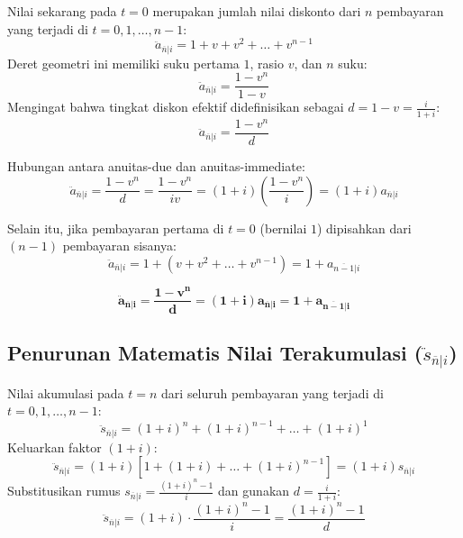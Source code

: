 \documentclass[11pt,a4paper]{article}
\begin{document}
Nilai sekarang pada $t = 0$ merupakan jumlah nilai diskonto dari $n$ pembayaran yang terjadi di $t = 0, 1, \dots, n-1$:
\begin{equation}
    \ddot{a}_{\overline{n}|i} = 1 + v + v^2 + \dots + v^{n-1}
\end{equation}
Deret geometri ini memiliki suku pertama $1$, rasio $v$, dan $n$ suku:
\begin{equation}
    \ddot{a}_{\overline{n}|i} = \frac{1 - v^n}{1 - v}
\end{equation}
Mengingat bahwa tingkat diskon efektif didefinisikan sebagai $d = 1 - v = \frac{i}{1+i}$:
\begin{equation}
    \ddot{a}_{\overline{n}|i} = \frac{1 - v^n}{d}
\end{equation}

Hubungan antara anuitas-due dan anuitas-immediate:
\begin{equation}
    \ddot{a}_{\overline{n}|i} = \frac{1 - v^n}{d} = \frac{1 - v^n}{i v} = (1+i) \left(\frac{1 - v^n}{i}\right) = (1+i) a_{\overline{n}|i}
\end{equation}

Selain itu, jika pembayaran pertama di $t = 0$ (bernilai $1$) dipisahkan dari $(n-1)$ pembayaran sisanya:
\begin{equation}
    \ddot{a}_{\overline{n}|i} = 1 + (v + v^2 + \dots + v^{n-1}) = 1 + a_{\overline{n-1}|i}
\end{equation}

\begin{definitionbox}
\begin{equation}
    \mathbf{\ddot{a}_{\overline{n}|i} = \frac{1 - v^n}{d} = (1+i) a_{\overline{n}|i} = 1 + a_{\overline{n-1}|i}}
\end{equation}
\end{definitionbox}

\subsection{Penurunan Matematis Nilai Terakumulasi (\texorpdfstring{$\ddot{s}_{\overline{n}|i}$}{\"s\_n|i})}

Nilai akumulasi pada $t = n$ dari seluruh pembayaran yang terjadi di $t = 0, 1, \dots, n-1$:
\begin{equation}
    \ddot{s}_{\overline{n}|i} = (1+i)^n + (1+i)^{n-1} + \dots + (1+i)^1
\end{equation}
Keluarkan faktor $(1+i)$:
\begin{equation}
    \ddot{s}_{\overline{n}|i} = (1+i) \left[ 1 + (1+i) + \dots + (1+i)^{n-1} \right] = (1+i) s_{\overline{n}|i}
\end{equation}
Substitusikan rumus $s_{\overline{n}|i} = \frac{(1+i)^n - 1}{i}$ dan gunakan $d = \frac{i}{1+i}$:
\begin{equation}
    \ddot{s}_{\overline{n}|i} = (1+i) \cdot \frac{(1+i)^n - 1}{i} = \frac{(1+i)^n - 1}{d}
\end{equation}
\end{document}
